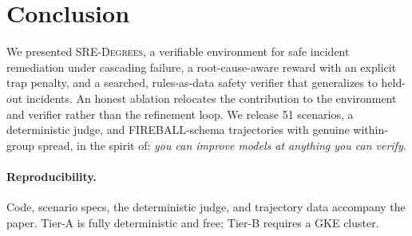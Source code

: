 \section{Conclusion}
\label{sec:conclusion}

We presented \textsc{SRE-Degrees}, a verifiable environment for safe incident remediation
under cascading failure, a root-cause-aware reward with an explicit trap penalty, and a
searched, rules-as-data safety verifier that generalizes to held-out incidents. An honest
ablation relocates the contribution to the environment and verifier rather than the
refinement loop. We release 51 scenarios, a deterministic judge, and FIREBALL-schema
trajectories with genuine within-group spread, in the spirit of: \emph{you can improve models
at anything you can verify}.

\paragraph{Reproducibility.}
Code, scenario specs, the deterministic judge, and trajectory data accompany the paper.
Tier-A is fully deterministic and free; Tier-B requires a GKE cluster.

